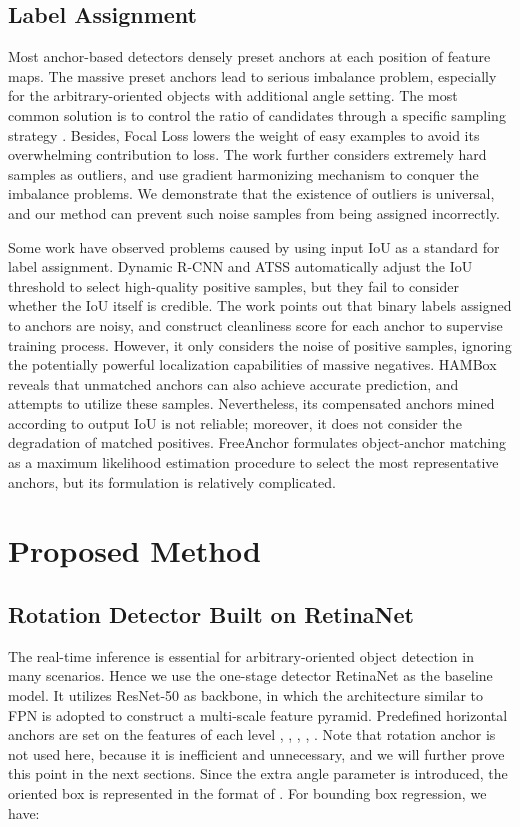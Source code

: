 \documentclass[letterpaper]{article} \usepackage{aaai21}  \usepackage{times}  \usepackage{helvet} \usepackage{courier}  \usepackage[hyphens]{url}  \usepackage{graphicx} \urlstyle{rm} \def\UrlFont{\rm}  \usepackage{natbib}  \usepackage{caption} \frenchspacing  \setlength{\pdfpagewidth}{8.5in}  \setlength{\pdfpageheight}{11in}  \usepackage{url}
\begin{document}
\subsection{Label Assignment}
Most anchor-based detectors densely preset anchors at each position of feature maps. The massive preset anchors lead to serious imbalance problem, especially for the arbitrary-oriented objects with additional angle setting. The most common solution is to control the ratio of candidates through a specific sampling strategy \cite{shrivastava2016training, pang2019libra}. Besides, Focal Loss \cite{lin2017focal} lowers the weight of easy examples to avoid its overwhelming contribution to loss. The work \cite{li2019gradient} further considers extremely hard samples as outliers, and use gradient harmonizing mechanism to conquer the imbalance problems. We demonstrate that the existence of outliers is universal, and our method can prevent such noise samples from being assigned incorrectly.


Some work have observed problems caused by using input IoU as a standard for label assignment. Dynamic R-CNN \cite{zhang2020dynamic} and ATSS \cite{zhang2020bridging} automatically adjust the IoU threshold to select high-quality positive samples, but they fail to consider whether the IoU itself is credible. The work \cite{li2020learning} points out that binary labels assigned to anchors are noisy, and construct cleanliness score for each anchor to supervise training process. However, it only considers the noise of positive samples, ignoring the potentially powerful localization capabilities of massive negatives.  HAMBox \cite{liu2020hambox} reveals that unmatched anchors can also achieve accurate prediction, and attempts to utilize these samples. Nevertheless, its compensated anchors mined according to output IoU is not reliable; moreover, it does not consider the degradation of matched positives. FreeAnchor \cite{zhang2019freeanchor} formulates object-anchor matching as a maximum likelihood estimation procedure to select the most representative anchors, but its formulation is relatively complicated.

\section{Proposed Method}

\subsection{Rotation Detector Built on RetinaNet}
The real-time inference is essential for arbitrary-oriented object detection in many scenarios. Hence we use the one-stage detector RetinaNet \cite{lin2017focal} as the baseline model. It utilizes ResNet-50 as backbone, in which the architecture similar to FPN \cite{lin2017feature} is adopted to construct a multi-scale feature pyramid. Predefined horizontal anchors are set on the features of each level , , , , . Note that rotation anchor is not used here, because it is inefficient and unnecessary, and we will further prove this point in the next sections. 
Since the extra angle parameter is introduced, the oriented  box is represented in the format of . For bounding box regression, we have:
\end{document}
